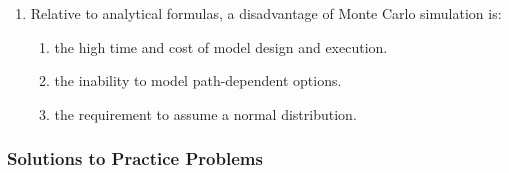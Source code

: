 \begin{enumerate}
	\item Relative to analytical formulas, a disadvantage of Monte Carlo simulation is:
	      \begin{enumerate}[label=\Alph*.]
		      \item the high time and cost of model design and execution.
		      \item the inability to model path-dependent options.
		      \item the requirement to assume a normal distribution.
	      \end{enumerate}
\end{enumerate}

\subsubsection{Solutions to Practice Problems}
\label{subsec:app_Solutions_M9}

